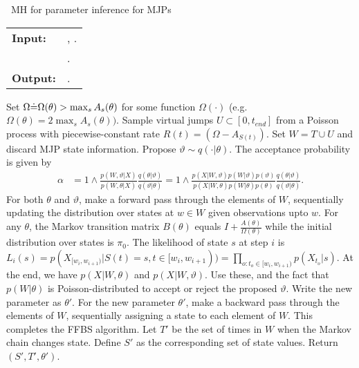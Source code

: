 \begin{algorithm}[H]
   \caption{\Naive\  MH for parameter inference for MJPs }
   \label{alg:MH_naive}
  \begin{tabular}{l l}
   \textbf{Input:  } & \text{Observations $X$}, 
                       \text{the previous MJP path $S(t) = (S, T)$ and parameters $\theta$ }.\\ 
                     & \text{A  Metropolis-Hasting proposal $q(\cdot | \theta)$}.\\
   \textbf{Output:  }& \text{A new MJP trajectory $S'(t) = (S', T')$, 
                            new MJP parameters $\theta'$}.\\
   \hline
   \end{tabular}
   \begin{algorithmic}[1]
     \State Set $\Omega {\doteq} \Omega(\theta) > \max_s{A_s(\theta)}$ for
     some function $\Omega(\cdot)$ (e.g.\ $\Omega(\theta) = 
      2\max_s A_s(\theta))$.
      \State Sample virtual jumps $U\subset[0, t_{end}]$ from a 
      Poisson process with piecewise-constant rate 
      $R(t) = (\Omega - A_{S(t)})$. 
    Set $W = T \cup U$ and discard MJP state information.
      \State Propose $\vartheta \sim q(\cdot| \theta)$.
          The acceptance probability is given by 
          \begin{align*}
          \alpha &=  1 \wedge \frac{p(W,\vartheta| X)}{p(W, \theta| X)} \frac{q(\theta|\vartheta)}{q(\vartheta|\theta)}
          =  1 \wedge \frac{p(X| W,\vartheta) p(W | \vartheta)p(\vartheta)}{p(X|W, \theta)p(W | \theta)p(\theta)} \frac{q(\theta|\vartheta)}{q(\vartheta|\theta)}.
          \end{align*}
    \State For both $\theta$ and $\vartheta$, make a forward pass through the 
    elements of $W$, sequentially updating the distribution over states at 
    $w \in W$ given observations upto $w$. 
    For any $\theta$, the Markov transition matrix 
    $B(\theta)$ equals $I + \frac{A(\theta)}{\Omega(\theta)}$ while the initial distribution
      over states is $\pi_0$. The likelihood of state $s$ at step $i$ is 
      $ L_i(s) = p(X_{[w_i, w_{i + 1})} | S(t) = s , t \in [w_i, w_{i + 1})) = 
      \prod_{o: t_o \in [w_i, w_{i + 1})}p(X_{t_o} | s)$.
    At the end, we have 
    $p(X|W,\theta)$ and $p(X|W,\vartheta)$. Use these, and the fact that 
    $p(W|\theta)$ is Poisson-distributed to accept or reject the
    proposed $\vartheta$. Write the new parameter as $\theta'$.
    \State For the new parameter $\theta'$, make a backward pass through 
    the elements of
    $W$, sequentially assigning a state to each element of $W$. This
    completes the FFBS algorithm.
    \State Let $T'$ be the set of times in $W$ when the Markov chain changes state. Define $S'$ as the corresponding set of state values. Return $(S', T', \theta')$.
\end{algorithmic}
\end{algorithm}
